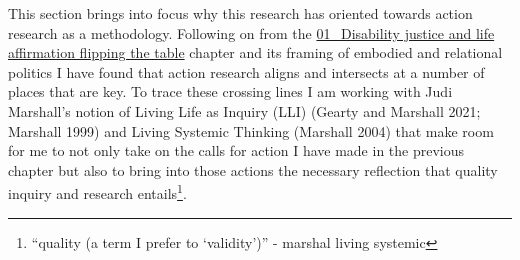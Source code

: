 This section brings into focus why this research has oriented towards
action research as a methodology. Following on from the
\href{../../01_Disability_justice_and_life_affirmation_flipping_the_table/01_Disability\%20justice\%20and\%20life\%20affirmation\%20flipping\%20the\%20table.md}{01\_Disability
justice and life affirmation flipping the table} chapter and its framing
of embodied and relational politics I have found that action research
aligns and intersects at a number of places that are key. To trace these
crossing lines I am working with Judi Marshall's notion of Living Life
as Inquiry (LLI) (Gearty and Marshall 2021; Marshall 1999) and Living
Systemic Thinking (Marshall 2004) that make room for me to not only take
on the calls for action I have made in the previous chapter but also to
bring into those actions the necessary reflection that quality inquiry
and research entails\footnote{``quality (a term I prefer to
  `validity')'' - marshal living systemic}.

